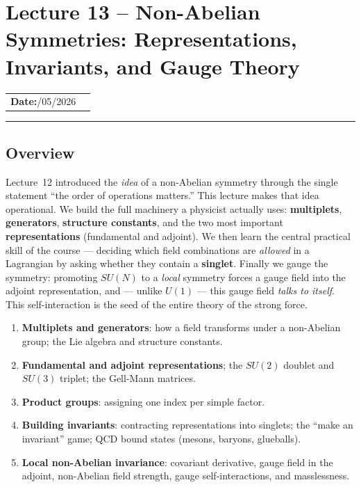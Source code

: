 \documentclass[../main.tex]{subfiles}
\begin{document}
\section{Lecture 13 -- Non-Abelian Symmetries: Representations, Invariants, and Gauge Theory}\label{sec:lec13}
\begin{center}
\begin{tabular}{ll}
  \textbf{Date:}\quad 28/05/2026 & \\
\end{tabular}
\end{center}
\hrule\vspace{1.5em}

\subsection*{Overview}

Lecture~12 introduced the \emph{idea} of a non-Abelian symmetry through the single statement ``the order of operations matters.'' This lecture makes that idea operational. We build the full machinery a physicist actually uses: \textbf{multiplets}, \textbf{generators}, \textbf{structure constants}, and the two most important \textbf{representations} (fundamental and adjoint). We then learn the central practical skill of the course --- deciding which field combinations are \emph{allowed} in a Lagrangian by asking whether they contain a \textbf{singlet}. Finally we gauge the symmetry: promoting $SU(N)$ to a \emph{local} symmetry forces a gauge field into the adjoint representation, and --- unlike $U(1)$ --- this gauge field \emph{talks to itself}. This self-interaction is the seed of the entire theory of the strong force.

\begin{enumerate}
  \item \textbf{Multiplets and generators}: how a field transforms under a non-Abelian group; the Lie algebra and structure constants.
  \item \textbf{Fundamental and adjoint representations}; the $SU(2)$ doublet and $SU(3)$ triplet; the Gell-Mann matrices.
  \item \textbf{Product groups}: assigning one index per simple factor.
  \item \textbf{Building invariants}: contracting representations into singlets; the ``make an invariant'' game; QCD bound states (mesons, baryons, glueballs).
  \item \textbf{Local non-Abelian invariance}: covariant derivative, gauge field in the adjoint, non-Abelian field strength, gauge self-interactions, and masslessness.
\end{enumerate}
\end{document}
